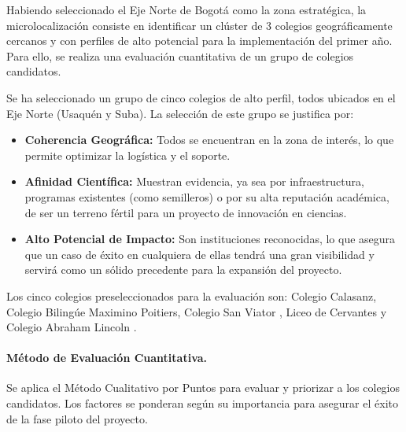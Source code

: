 Habiendo seleccionado el Eje Norte de Bogotá como la zona estratégica, la
microlocalización consiste en identificar un clúster de 3 colegios
geográficamente cercanos y con perfiles de alto potencial para la implementación
del primer año. Para ello, se realiza una evaluación cuantitativa de un grupo de
colegios candidatos.

Se ha seleccionado un grupo de cinco colegios de alto perfil, todos ubicados en
el Eje Norte (Usaquén y Suba). La selección de este grupo se justifica por:
\begin{itemize}
  \item \textbf{Coherencia Geográfica:} Todos se encuentran en la zona de
    interés, lo que permite optimizar la logística y el soporte.
  \item \textbf{Afinidad Científica:} Muestran evidencia, ya sea por
    infraestructura, programas existentes (como semilleros) o por su alta
    reputación académica, de ser un terreno fértil para un proyecto de
    innovación en ciencias.
  \item \textbf{Alto Potencial de Impacto:} Son instituciones reconocidas, lo
    que asegura que un caso de éxito en cualquiera de ellas tendrá una gran
    visibilidad y servirá como un sólido precedente para la expansión del
    proyecto.
\end{itemize}
Los cinco colegios preseleccionados para la evaluación son: Colegio Calasanz,
Colegio Biling\'ue Maximino Poitiers, Colegio San Viator \cite{sanviator_web},
Liceo de Cervantes \cite{liceocervantes_web} y Colegio Abraham Lincoln
\cite{abrahamlincoln_web}.

\paragraph{Método de Evaluación Cuantitativa.}
Se aplica el Método Cualitativo por Puntos para evaluar y priorizar a los
colegios candidatos. Los factores se ponderan según su importancia para asegurar
el éxito de la fase piloto del proyecto.

